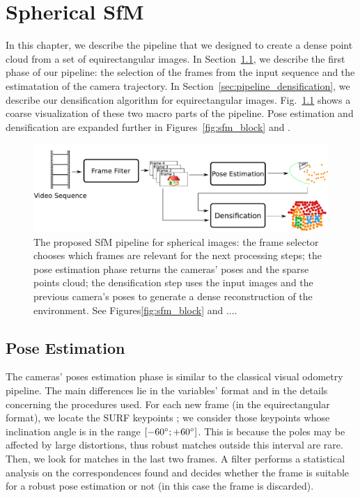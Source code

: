 \chapter{Spherical SfM}
In this chapter, we describe the pipeline that we designed to create a dense 
point cloud from a set of equirectangular images.
In Section~\ref{sec:pipeline_pose_estimation}, we describe the first phase of our
pipeline: the selection of the frames from the input sequence and the estimatation of
the camera trajectory. In Section~\ref{sec:pipeline_densification}, we describe 
our densification algorithm for equirectangular images.
Fig.~\ref{fig:pipeline_overview} shows a coarse visualization of these two macro parts of the 
pipeline. Pose estimation and densification are 
expanded further in Figures~\ref{fig:sfm_block} and .

\begin{figure}
    \centering
    \includegraphics[width=0.8\linewidth]{img/pipeline_overview.pdf}
    \caption{The proposed SfM pipeline for spherical images: the frame selector chooses which frames are 
    relevant for the next processing steps; the pose estimation phase returns the cameras' 
    poses and the sparse points cloud; the densification step uses 
    the input images and the previous camera's poses to generate a dense
    reconstruction of the environment. See Figures\ref{fig:sfm_block} and ....}
	\label{fig:pipeline_overview}
\end{figure}

\section{Pose Estimation}
\label{sec:pipeline_pose_estimation}
The cameras' poses estimation phase is similar to the classical visual 
odometry pipeline. The main differences lie in the variables' format and in 
the details concerning the procedures used.
For each new frame (in the equirectangular format), we locate the
SURF keypoints \cite{bay2006surf}; we consider those keypoints whose inclination angle is in the range $[-60\degree; +60\degree]$. This is because the poles may be affected by large 
distortions, thus robust matches outside this interval are rare.
Then, we look for matches in the last two frames. A filter performs a 
statistical analysis on the correspondences found and decides whether the frame 
is suitable for a robust pose estimation or not (in this case the frame is 
discarded).

